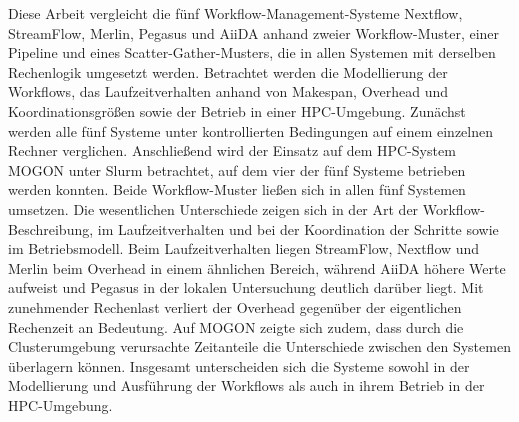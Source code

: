 %
\label{sec:abstract}
Diese Arbeit vergleicht die fünf Workflow-Management-Systeme
Nextflow, StreamFlow, Merlin, Pegasus und AiiDA anhand zweier
Workflow-Muster, einer Pipeline und eines Scatter-Gather-Musters,
die in allen Systemen mit derselben Rechenlogik umgesetzt werden.
Betrachtet werden die Modellierung der Workflows, das
Laufzeitverhalten anhand von Makespan, Overhead und
Koordinationsgrößen sowie der Betrieb in einer HPC-Umgebung.
Zunächst werden alle fünf Systeme unter kontrollierten Bedingungen
auf einem einzelnen Rechner verglichen. Anschließend wird der
Einsatz auf dem HPC-System MOGON unter Slurm betrachtet, auf dem
vier der fünf Systeme betrieben werden konnten.
Beide Workflow-Muster ließen sich in allen fünf Systemen umsetzen.
Die wesentlichen Unterschiede zeigen sich in der Art der
Workflow-Beschreibung, im Laufzeitverhalten und bei der Koordination
der Schritte sowie im Betriebsmodell. Beim Laufzeitverhalten liegen StreamFlow, Nextflow und Merlin beim Overhead in einem ähnlichen Bereich, während AiiDA höhere Werte
aufweist und Pegasus in der lokalen Untersuchung deutlich darüber
liegt. Mit zunehmender Rechenlast verliert der Overhead gegenüber
der eigentlichen Rechenzeit an Bedeutung. Auf MOGON zeigte sich
zudem, dass durch die Clusterumgebung verursachte Zeitanteile die
Unterschiede zwischen den Systemen überlagern können. Insgesamt
unterscheiden sich die Systeme sowohl in der Modellierung und
Ausführung der Workflows als auch in ihrem Betrieb in der
HPC-Umgebung.